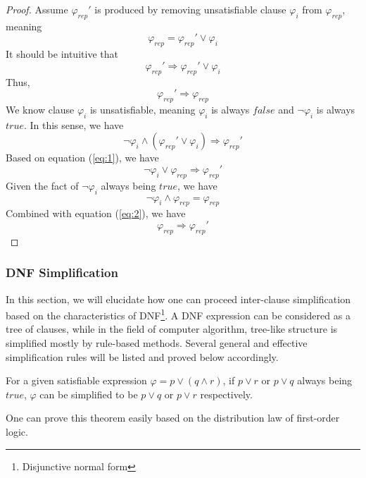 \begin{proof}
Assume $\varphi _{rep}'$ is produced by removing unsatisfiable clause $\varphi _{i}$ from $\varphi _{rep}$, meaning
\begin{equation}
\label{eq:1}
\varphi _{rep} = \varphi _{rep}' \vee \varphi _{i}
\end{equation}
It should be intuitive that
\begin{equation}
\varphi _{rep}' \Longrightarrow \varphi _{rep}' \vee \varphi _{i}
\end{equation}
Thus,
\begin{equation}
\varphi _{rep}' \Longrightarrow \varphi _{rep}
\end{equation}
We know clause $\varphi _{i}$ is unsatisfiable, meaning $\varphi _{i}$ is always $false$ and $\neg \varphi _{i}$ is always $true$. In this sense, we have
\begin{equation}
\neg \varphi _{i} \wedge (\varphi _{rep}' \vee \varphi _{i}) \Longrightarrow \varphi _{rep}'
\end{equation}
Based on equation (\ref{eq:1}), we have
\begin{equation}
\label{eq:2}
\neg \varphi _{i} \vee \varphi _{rep} \Longrightarrow \varphi _{rep}'
\end{equation}
Given the fact of $\neg \varphi _{i}$ always being $true$, we have
\begin{equation}
\neg \varphi _{i} \wedge \varphi _{rep} = \varphi _{rep}
\end{equation}
Combined with equation (\ref{eq:2}), we have
\begin{equation}
\varphi _{rep} \Longrightarrow \varphi _{rep}'
\end{equation}
\end{proof}

\subsubsection{DNF Simplification}
In this section, we will elucidate how one can proceed inter-clause simplification based on the characteristics of DNF\footnote{Disjunctive normal form}.
A DNF expression can be considered as a tree of clauses, while in the field of computer algorithm, tree-like structure is simplified mostly by rule-based methods.
Several general and effective simplification rules will be listed and proved below accordingly.

\begin{theorem}
For a given satisfiable expression $\varphi = p \vee (q \wedge r)$, if $p \vee r$ or $p \vee q$ always being $true$, $\varphi$ can be simplified to be $p \vee q$ or $p \vee r$ respectively.
\end{theorem}
One can prove this theorem easily based on the distribution law of first-order logic.


